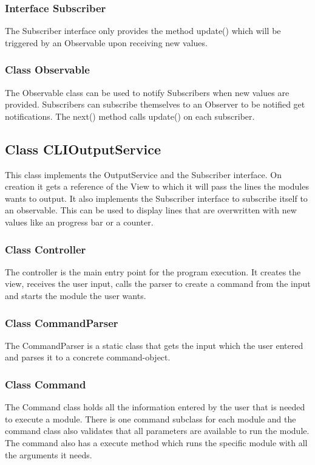 \documentclass[parskip=full]{scrartcl}
\begin{document}
 \subsubsection{Interface Subscriber}
The Subscriber interface only provides the method update() which will be triggered by an Observable upon receiving new values.

\subsubsection{Class Observable} 
The Observable class can be used to notify Subscribers when new values are provided.
Subscribers can subscribe themselves to an Observer to be notified get notifications.
The next() method calls update() on each subscriber.

\subsection{Class CLIOutputService}
This class implements the OutputService and the Subscriber interface. 
On creation it gets a reference of the View to which it will pass the lines the modules wants to output.
It also implements the Subscriber interface to subscribe itself to an observable.
This can be used to display lines that are overwritten with new values like an progress bar or a counter.

\subsubsection{Class Controller} 
The controller is the main entry point for the program execution. 
It creates the view, receives the user input, calls the parser to create a command from the input and starts the module the user wants.

\subsubsection{Class CommandParser}
The CommandParser is a static class that gets the input which the user entered and parses it to a concrete command-object.

\subsubsection{Class Command}
The Command class holds all the information entered by the user that is needed to execute a module.
There is one command subclass for each module and the command class also validates that all parameters are available to run the module.
The command also has a execute method which runs the specific module with all the arguments it needs.
\end{document}
